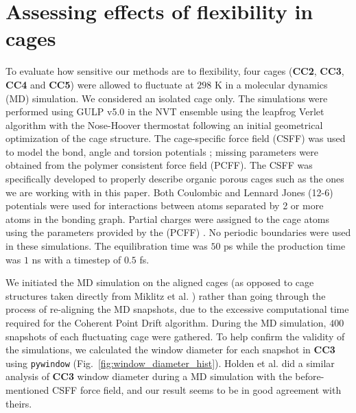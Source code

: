 \documentclass[journal=jacsat,manuscript=article]{achemso}
\begin{document}
\newpage
\clearpage

\section{\color{red}Assessing effects of flexibility in cages} 
\label{sec:flexibility}

{\color{red}To evaluate how sensitive our methods are to flexibility, four cages (\textbf{CC2}, \textbf{CC3}, \textbf{CC4} and \textbf{CC5}) were allowed to fluctuate at $298$ K in a molecular dynamics (MD) simulation. We considered an isolated cage only. The simulations were performed using GULP v5.0 \cite{julian2003gulp} in the NVT ensemble using the leapfrog Verlet algorithm with the Nose-Hoover thermostat following an initial geometrical optimization of the cage structure. The cage-specific force field (CSFF) was used to model the bond, angle and torsion potentials \cite{holden2012bespoke}; missing parameters were obtained from the polymer consistent force field (PCFF). The CSFF was specifically developed to properly describe organic porous cages such as the ones we are working with in this paper. Both Coulombic and Lennard Jones (12-6) potentials were used for interactions between atoms separated by 2 or more atoms in the bonding graph. Partial charges were assigned to the cage atoms using the parameters provided by the (PCFF) \cite{sun1998compass}\cite{holden2012bespoke}. No periodic boundaries were used in these simulations. The equilibration time was $50$ ps while the production time was $1$ ns with a timestep of $0.5$ fs.

We initiated the MD simulation on the aligned cages (as opposed to cage structures taken directly from Miklitz et al. \cite{miklitz2017computational}) rather than going through the process of re-aligning the MD snapshots, due to the excessive computational time required for the Coherent Point Drift algorithm. During the MD simulation, $400$ snapshots of each fluctuating cage were gathered. To help confirm the validity of the simulations, we calculated the window diameter for each snapshot in \textbf{CC3} using \texttt{pywindow} (Fig.~\ref{fig:window_diameter_hist}). Holden et al.\cite{holden2012bespoke} did a similar analysis of \textbf{CC3} window diameter during a MD simulation with the before-mentioned CSFF force field, and our result seems to be in good agreement with theirs.

}
\end{document}
